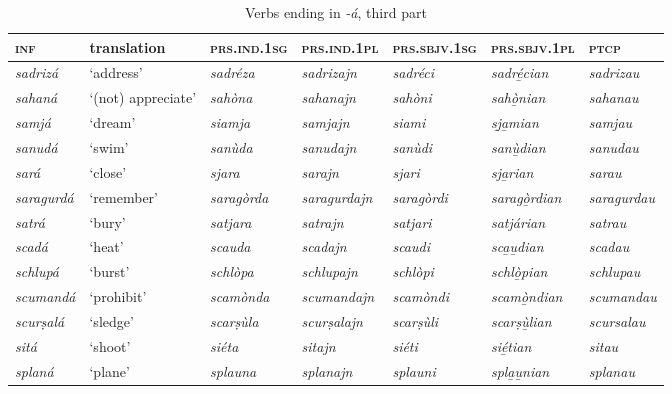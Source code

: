 \begin{sidewaystable}
	\caption{Verbs ending in \textit{-á}, third part}
	\label{stemalta3}
	\begin{tabularx}{\textwidth}{lllllll}
		\lsptoprule
		\textsc{\textbf{inf}} & \textbf{translation} & \textsc{\textbf{prs.ind.1sg}} & \textsc{\textbf{prs.ind.1pl}} & \textsc{\textbf{prs.sbjv.1sg}} & \textsc{\textbf{prs.sbjv.1pl}} & \textsc{\textbf{ptcp}} \\
		\midrule
		\textit{sadrizá} & `address' & \textit{sadréza} & \textit{sadrizajn} & \textit{sadréci} & \textit{sadré̱cian} & \textit{sadrizau}\\
		\textit{sahaná} & ‘(not) appreciate’ & \textit{sahòna} & \textit{sahanajn} & \textit{sahòni} & \textit{sahò̱nian} & \textit{sahanau}\\
		\textit{samjá} & ‘dream’ & \textit{siamja} & \textit{samjajn} & \textit{siami} &  \textit{sj̱a̱mian} & \textit{samjau}\\
		\textit{sanudá} & `swim' & \textit{sanùda} & \textit{sanudajn} & \textit{sanùdi} & \textit{sanù̱dian} & \textit{sanudau} \\
		\textit{sará} & `close' & \textit{sjara} & \textit{sarajn} & \textit{sjari} & \textit{sja̲rian} & \textit{sarau} \\
		\textit{saragurdá} & `remember' & \textit{saragòrda} & \textit{saragurdajn} & \textit{saragòrdi} & \textit{saragò̱rdian} & \textit{saragurdau}\\
		\textit{satrá} & `bury' & \textit{satjara} & \textit{satrajn} & \textit{satjari} & \textit{satjárian} & \textit{satrau}\\
		\textit{scadá} & `heat' & \textit{scauda} & \textit{scadajn} & \textit{scaudi} & \textit{sca̱u̱dian} & \textit{scadau}\\
		\textit{schlupá} & `burst' & \textit{schlòpa} & \textit{schlupajn} & \textit{schlòpi} & \textit{schlò̱pian} & \textit{schlupau}\\
		\textit{scumandá} & `prohibit' & \textit{scamònda} & \textit{scumandajn} & \textit{scamòndi} & \textit{scamò̱ndian} & \textit{scumandau} \\
		\textit{scurṣalá} & `sledge' & \textit{scarṣùla} & \textit{scurṣalajn} & \textit{scarṣùli} & \textit{scarṣù̱lian} & \textit{scursalau}\\
		\textit{sitá} & ‘shoot’ & \textit{siéta} & \textit{sitajn} & \textit{siéti} & \textit{sié̱tian} & \textit{sitau}\\
		\textit{splaná} & ‘plane’ & \textit{splauna} & \textit{splanajn} & \textit{splauni} & \textit{spla̱u̱nian} & \textit{splanau}\\

\end{tabularx}
\end{sidewaystable}
